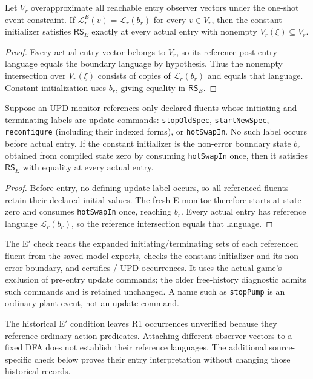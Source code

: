 \begin{lemma}
\label{lem:rs-e}
Let $V_r$ overapproximate all reachable entry observer vectors under the one-shot event constraint. If $\mathcal L_r^E(v)=\mathcal L_r(b_r)$ for every $v\in V_r$, then the constant initializer satisfies $\mathsf{RS}_E$ exactly at every actual entry with nonempty $V_r(\xi)\subseteq V_r$.
\end{lemma}
\begin{proof}
Every actual entry vector belongs to $V_r$, so its reference post-entry language equals the boundary language by hypothesis. Thus the nonempty intersection over $V_r(\xi)$ consists of copies of $\mathcal L_r(b_r)$ and equals that language. Constant initialization uses $b_r$, giving equality in $\mathsf{RS}_E$.
\end{proof}
\begin{samepage}
\begin{lemma}
\label{lem:rs-e-prime}
Suppose an UPD monitor references only declared fluents whose initiating and terminating labels are update commands: \texttt{stopOldSpec}, \texttt{startNewSpec}, \texttt{reconfigure} (including their indexed forms), or \texttt{hotSwapIn}. No such label occurs before actual entry. If the constant initializer is the non-error boundary state $b_r$ obtained from compiled state zero by consuming \texttt{hotSwapIn} once, then it satisfies $\mathsf{RS}_E$ with equality at every actual entry.
\end{lemma}
\begin{proof}
Before entry, no defining update label occurs, so all referenced fluents retain their declared initial values.
The fresh E monitor therefore starts at state zero and consumes \texttt{hotSwapIn} once, reaching $b_r$.
Every actual entry has reference language $\mathcal L_r(b_r)$, so the reference intersection equals that language.
\end{proof}
\end{samepage}
The E$'$ check reads the expanded initiating/terminating sets of each referenced fluent from the saved model exports, checks the constant initializer and its non-error boundary, and certifies \RSEExactUpd/\RSUpdOccurrences{} UPD occurrences. It uses the actual game's exclusion of pre-entry update commands; the older free-history diagnostic admits such commands and is retained unchanged. A name such as \texttt{stopPump} is an ordinary plant event, not an update command.

The historical E$'$ condition leaves \RSEUnverifiedUpd{} R1 occurrences unverified because they reference ordinary-action predicates. Attaching different observer vectors to a fixed DFA does not establish their reference languages. The additional source-specific check below proves their entry interpretation without changing those historical records.

